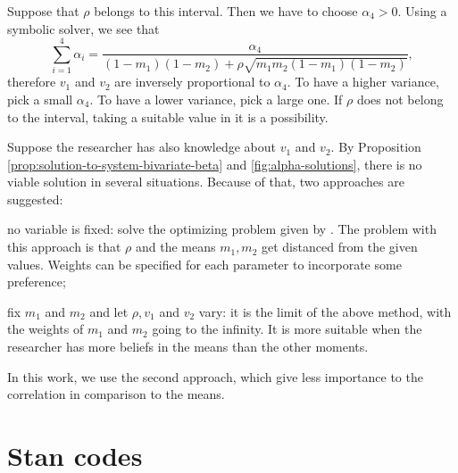 Suppose that $\rho$ belongs to this interval. Then we have to choose $\alpha_4
> 0$. Using a symbolic solver, we see that 
$$
\sum_{i=1}^4 \alpha_i = \frac{\alpha_4}{(1-m_1)(1-m_2) + \rho\sqrt{m_1m_2(1-m_1)(1-m_2)}}, 
$$
therefore $v_1$ and $v_2$ are inversely proportional to $\alpha_4$. To have a
higher variance, pick a small $\alpha_4$. To have a lower variance, pick a
large one. If $\rho$ does not belong to the interval, taking a suitable value
in it is a possibility. 

Suppose the researcher has also knowledge about $v_1$ and $v_2$. By
Proposition \ref{prop:solution-to-system-bivariate-beta} and
\autoref{fig:alpha-solutions}, there is no viable
solution in several situations. Because of that, two approaches are suggested:

\begin{alineas}
  \item no variable is fixed: solve the optimizing problem given by 
  \textcite[p. 7]{olkin2015constructions}. The problem with this approach is 
  that $\rho$ and the means $m_1, m_2$ get distanced from the given values.
  Weights can be specified for each parameter to incorporate some preference;  
  \item fix $m_1$ and $m_2$ and let $\rho, v_1$ and $v_2$ vary: it is the
  limit of the above method, with the weights of $m_1$ and $m_2$ going to the
  infinity. It is more suitable when the researcher has more beliefs in the
  means than the other moments. 
\end{alineas}

In this work, we use the second approach, which give less importance to the
correlation in comparison to the means. 

\chapter{Stan codes}
\label{appendix:stan-codes}